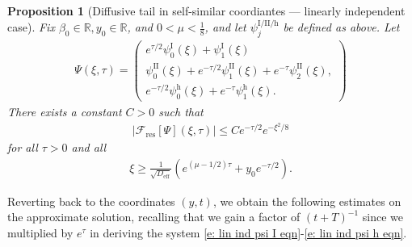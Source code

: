 \documentclass[11pt]{article}
\newcommand{\R}{\mathbb{R}}
\newcommand{\mcf}{\mathcal{F}}
\newtheorem{prop}{Proposition}
\numberwithin{equation}{section}
\numberwithin{prop}{section}
\newcommand{\psih}{\psi^\mathrm{h}}
\newcommand{\Deff}{D_\mathrm{eff}}
\newcommand{\psiI}{\psi^\mathrm{I}}
\newcommand{\psiII}{\psi^\mathrm{II}}
\begin{document}
\begin{prop}[Diffusive tail in self-similar coordiantes --- linearly independent case]\label{p: lin ind diffusive tail}
	Fix $\beta_0 \in \R, y_0 \in \R$, and $0 < \mu < \frac{1}{8}$, and let $\psi^\mathrm{I/II/h}_j$ be defined as above. Let
	\begin{align}
	\Psi(\xi, \tau) = \begin{pmatrix}
	e^{\tau/2} \psiI_0 (\xi) + \psiI_1 (\xi) \\ 
	\psiII_0 (\xi) + e^{-\tau/2} \psiII_1(\xi) + e^{-\tau} \psiII_2 (\xi), \\
	e^{-\tau/2} \psih_0 (\xi) + e^{-\tau} \psih_1(\xi). 
	\end{pmatrix}
	\end{align}
	There exists a constant $C > 0$ such that
	\begin{align}
	\left| \mcf_\mathrm{res} [\Psi] (\xi, \tau) \right| \leq C e^{-\tau/2} e^{-\xi^2/8}
	\end{align}
	for all $\tau > 0$ and all
	\begin{align}
	\xi \geq \frac{1}{\sqrt{\Deff}} \left( e^{(\mu - 1/2)\tau} + y_0 e^{-\tau/2} \right). 
	\end{align}
\end{prop}

Reverting back to the coordinates $(y,t)$, we obtain the following estimates on the approximate solution, recalling that we gain a factor of $(t+T)^{-1}$ since we multiplied by $e^\tau$ in deriving the system \eqref{e: lin ind psi I eqn}-\eqref{e: lin ind psi h eqn}. 
\end{document}
